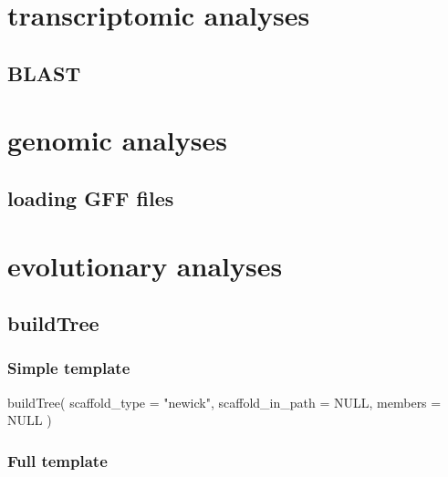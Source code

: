 \documentclass[
]{krantz}
\newenvironment{Shaded}{\begin{snugshade}}{\end{snugshade}}
\newcommand{\AttributeTok}[1]{\textcolor[rgb]{0.77,0.63,0.00}{#1}}
\newcommand{\ConstantTok}[1]{\textcolor[rgb]{0.00,0.00,0.00}{#1}}
\newcommand{\FunctionTok}[1]{\textcolor[rgb]{0.00,0.00,0.00}{#1}}
\newcommand{\NormalTok}[1]{#1}
\newcommand{\StringTok}[1]{\textcolor[rgb]{0.31,0.60,0.02}{#1}}
\begin{document}
\hypertarget{transcriptomic-analyses}{%
\section{transcriptomic analyses}\label{transcriptomic-analyses}}

\hypertarget{blast}{%
\subsection{BLAST}\label{blast}}

\hypertarget{genomic-analyses}{%
\section{genomic analyses}\label{genomic-analyses}}

\hypertarget{loading-gff-files}{%
\subsection{loading GFF files}\label{loading-gff-files}}

\hypertarget{evolutionary-analyses}{%
\section{evolutionary analyses}\label{evolutionary-analyses}}

\hypertarget{buildtree}{%
\subsection{buildTree}\label{buildtree}}

\hypertarget{simple-template}{%
\subsubsection{Simple template}\label{simple-template}}

\begin{Shaded}
\begin{Highlighting}[]
\FunctionTok{buildTree}\NormalTok{(}
  \AttributeTok{scaffold\_type =} \StringTok{"newick"}\NormalTok{,}
  \AttributeTok{scaffold\_in\_path =} \ConstantTok{NULL}\NormalTok{,}
  \AttributeTok{members =} \ConstantTok{NULL}
\NormalTok{)}
\end{Highlighting}
\end{Shaded}

\hypertarget{full-template}{%
\subsubsection{Full template}\label{full-template}}
\end{document}
